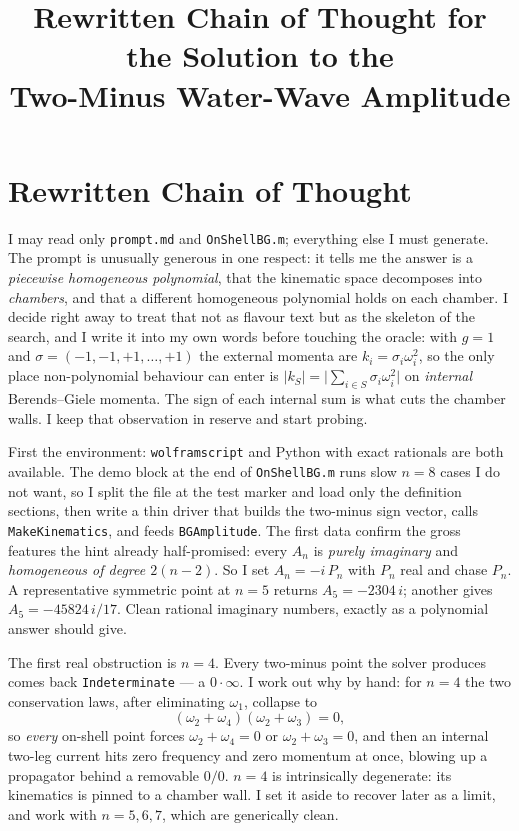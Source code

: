 \documentclass{article}
\title{Rewritten Chain of Thought for the Solution to the\\
Two-Minus Water-Wave Amplitude}
\author{}
\date{}
\begin{document}
\maketitle


\section*{Rewritten Chain of Thought}

I may read only \texttt{prompt.md} and \texttt{OnShellBG.m}; everything else I
must generate. The prompt is unusually generous in one respect: it tells me the
answer is a \emph{piecewise homogeneous polynomial}, that the kinematic space
decomposes into \emph{chambers}, and that a different homogeneous polynomial
holds on each chamber. I decide right away to treat that not as flavour text but
as the skeleton of the search, and I write it into my own words before touching
the oracle: with $g=1$ and $\sigma=(-1,-1,+1,\dots,+1)$ the external momenta are
$k_i=\sigma_i\omega_i^2$, so the only place non-polynomial behaviour can enter is
$|k_S|=\big|\sum_{i\in S}\sigma_i\omega_i^2\big|$ on \emph{internal} Berends--Giele
momenta. The sign of each internal sum is what cuts the chamber walls. I keep
that observation in reserve and start probing.

First the environment: \texttt{wolframscript} and Python with exact rationals are
both available. The demo block at the end of \texttt{OnShellBG.m} runs slow $n=8$
cases I do not want, so I split the file at the test marker and load only the
definition sections, then write a thin driver that builds the two-minus sign
vector, calls \texttt{MakeKinematics}, and feeds \texttt{BGAmplitude}. The first
data confirm the gross features the hint already half-promised: every $A_n$ is
\emph{purely imaginary} and \emph{homogeneous of degree $2(n-2)$}. So I set
$A_n=-i\,P_n$ with $P_n$ real and chase $P_n$. A representative symmetric point
at $n=5$ returns $A_5=-2304\,i$; another gives $A_5=-45824\,i/17$. Clean rational
imaginary numbers, exactly as a polynomial answer should give.

The first real obstruction is $n=4$. Every two-minus point the solver produces
comes back \texttt{Indeterminate} --- a $0\cdot\infty$. I work out why by hand:
for $n=4$ the two conservation laws, after eliminating $\omega_1$, collapse to
\[
(\omega_2+\omega_4)(\omega_2+\omega_3)=0,
\]
so \emph{every} on-shell point forces $\omega_2+\omega_4=0$ or $\omega_2+\omega_3=0$,
and then an internal two-leg current hits zero frequency and zero momentum at
once, blowing up a propagator behind a removable $0/0$. $n=4$ is intrinsically
degenerate: its kinematics is pinned to a chamber wall. I set it aside to recover
later as a limit, and work with $n=5,6,7$, which are generically clean.
\end{document}
